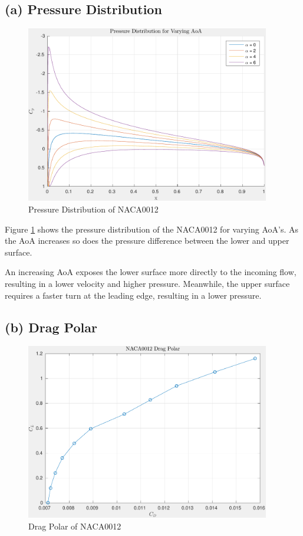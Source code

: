 \documentclass[letterpaper,12pt,]{article}
\begin{document}
\subsection*{(a) Pressure Distribution}
\begin{figure}[!h]
    \centering
    \includegraphics[width = 0.95\textwidth]{./figures/q3pressure.pdf}
    \caption{Pressure Distribution of NACA0012}
    \label{fig:q3p}
\end{figure}

Figure \ref{fig:q3p} shows the pressure distribution of the NACA0012 for varying AoA's.
As the AoA increases so does the pressure difference between the lower and upper surface.

An increasing AoA exposes the lower surface more directly to the incoming flow, resulting in a lower velocity and higher pressure. Meanwhile, the upper surface requires a faster turn at the leading edge, resulting in a lower pressure.

\subsection*{(b) Drag Polar}
\begin{figure}[!h]
    \centering
    \includegraphics[width = 0.95\textwidth]{./figures/q3dp.pdf}
    \caption{Drag Polar of NACA0012}
    \label{fig:q3dp}
\end{figure}
\end{document}
